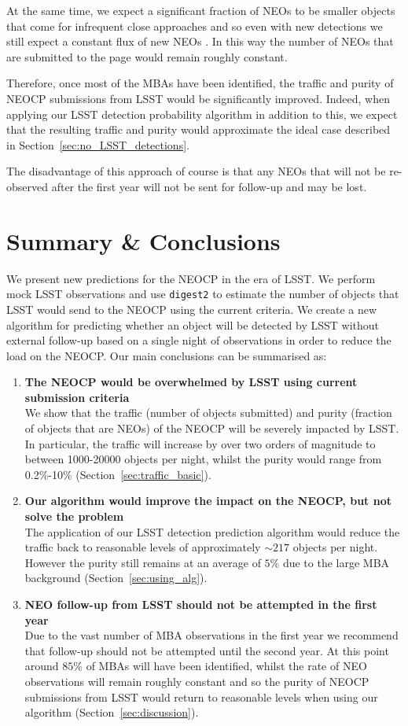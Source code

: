 \documentclass[twocolumn]{aastex631}
\newcommand{\dig}{\texttt{digest2}}
\newcommand{\npernightAlg}{217}
\newcommand{\purityAlg}{5}
\begin{document}
At the same time, we expect a significant fraction of NEOs to be smaller objects that come for infrequent close approaches and so even with new detections we still expect a constant flux of new NEOs \citep{Juric+2020}. In this way the number of NEOs that are submitted to the page would remain roughly constant.

Therefore, once most of the MBAs have been identified, the traffic and purity of NEOCP submissions from LSST would be significantly improved. Indeed, when applying our LSST detection probability algorithm in addition to this, we expect that the resulting traffic and purity would approximate the ideal case described in Section~\ref{sec:no_LSST_detections}.

The disadvantage of this approach of course is that any NEOs that will not be re-observed after the first year will not be sent for follow-up and may be lost.

\section{Summary \& Conclusions} \label{sec:conclusion}
We present new predictions for the NEOCP in the era of LSST. We perform mock LSST observations and use \dig{} to estimate the number of objects that LSST would send to the NEOCP using the current criteria. We create a new algorithm for predicting whether an object will be detected by LSST without external follow-up based on a single night of observations in order to reduce the load on the NEOCP. Our main conclusions can be summarised as:

\begin{enumerate}
    \item \textbf{The NEOCP would be overwhelmed by LSST using current submission criteria}\\We show that the traffic (number of objects submitted) and purity (fraction of objects that are NEOs) of the NEOCP will be severely impacted by LSST. In particular, the traffic will increase by over two orders of magnitude to between 1000-20000 objects per night, whilst the purity would range from 0.2\%-10\% (Section~\ref{sec:traffic_basic}).
    \item \textbf{Our algorithm would improve the impact on the NEOCP, but not solve the problem}\\The application of our LSST detection prediction algorithm would reduce the traffic back to reasonable levels of approximately ${\sim}\npernightAlg{}$ objects per night. However the purity still remains at an average of $\purityAlg{}\%$ due to the large MBA background (Section~\ref{sec:using_alg}).
    \item \textbf{NEO follow-up from LSST should not be attempted in the first year}\\Due to the vast number of MBA observations in the first year we recommend that follow-up should not be attempted until the second year. At this point around $85\%$ of MBAs will have been identified, whilst the rate of NEO observations will remain roughly constant and so the purity of NEOCP submissions from LSST would return to reasonable levels when using our algorithm (Section~\ref{sec:discussion}).
\end{enumerate}
\end{document}
